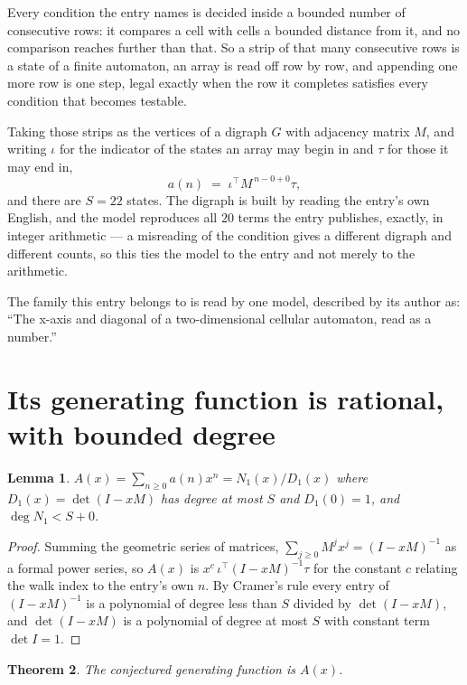 \documentclass[11pt,a4paper]{article}
\theoremstyle{plain}
\newtheorem{theorem}{Theorem}
\newtheorem{lemma}[theorem]{Lemma}
\theoremstyle{definition}
\begin{document}
Every condition the entry names is decided inside a bounded number of consecutive rows: it
compares a cell with cells a bounded distance from it, and no comparison reaches further than
that. So a strip of that many consecutive rows is a state of a finite automaton, an array is
read off row by row, and appending one more row is one step, legal exactly when the row it
completes satisfies every condition that becomes testable.

Taking those strips as the vertices of a digraph $G$ with adjacency matrix $M$, and writing
$\iota$ for the indicator of the states an array may begin in and $\tau$ for those it may end
in,
\[
a(n)\;=\;\iota^{\!\top}M^{\,n-0+0}\tau ,
\]
and there are $S=22$ states. The digraph is built by reading the entry's own English, and the
model reproduces all $20$ terms the entry publishes, exactly, in integer arithmetic --- a
misreading of the condition gives a different digraph and different counts, so this ties the
model to the entry and not merely to the arithmetic.

The family this entry belongs to is read by one model, described by its author as: ``The x-axis and diagonal of a two-dimensional cellular automaton, read as a number.''


\section{Its generating function is rational, with bounded degree}

\begin{lemma}\label{lem:rat}
$A(x)=\sum_{n\ge0}a(n)x^n=N_1(x)/D_1(x)$ where $D_1(x)=\det(I-xM)$ has degree at most
$S$ and $D_1(0)=1$, and $\deg N_1<S+0$.
\end{lemma}

\begin{proof}
Summing the geometric series of matrices, $\sum_{j\ge0}M^jx^j=(I-xM)^{-1}$ as a formal
power series, so $A(x)$ is $x^{c}\,\iota^{\!\top}(I-xM)^{-1}\tau$ for the constant $c$
relating the walk index to the entry's own $n$. By Cramer's rule every entry of
$(I-xM)^{-1}$ is a polynomial of degree less than $S$ divided by $\det(I-xM)$, and
$\det(I-xM)$ is a polynomial of degree at most $S$ with constant term $\det I=1$.
\end{proof}

\begin{theorem}
The conjectured generating function is $A(x)$.
\end{theorem}
\end{document}
